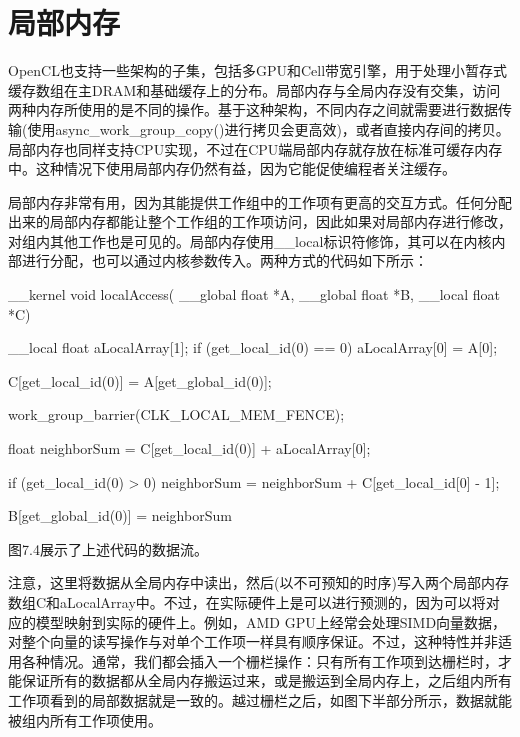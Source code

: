 \section{局部内存}

OpenCL也支持一些架构的子集，包括多GPU和Cell带宽引擎，用于处理小暂存式缓存数组在主DRAM和基础缓存上的分布。局部内存与全局内存没有交集，访问两种内存所使用的是不同的操作。基于这种架构，不同内存之间就需要进行数据传输(使用async\_\allowbreak{}work\_\allowbreak{}group\_\allowbreak{}copy()进行拷贝会更高效)，或者直接内存间的拷贝。局部内存也同样支持CPU实现，不过在CPU端局部内存就存放在标准可缓存内存中。这种情况下使用局部内存仍然有益，因为它能促使编程者关注缓存。

局部内存非常有用，因为其能提供工作组中的工作项有更高的交互方式。任何分配出来的局部内存都能让整个工作组的工作项访问，因此如果对局部内存进行修改，对组内其他工作也是可见的。局部内存使用\_\allowbreak{}\_\allowbreak{}local标识符修饰，其可以在内核内部进行分配，也可以通过内核参数传入。两种方式的代码如下所示：

\begin{codebox}[cpp]
__kernel
void localAccess(
  __global float *A,
  __global float *B,
  __local float *C){

  __local float aLocalArray[1];
  if (get_local_id(0) == 0){
    aLocalArray[0] = A[0];
  }

  C[get_local_id(0)] = A[get_global_id(0)];

  work_group_barrier(CLK_LOCAL_MEM_FENCE);

  float neighborSum = C[get_local_id(0)] + aLocalArray[0];

  if (get_local_id(0) > 0){
    neighborSum = neighborSum + C[get_local_id[0] - 1];
  }

  B[get_global_id(0)] = neighborSum
}
\end{codebox}

图7.4展示了上述代码的数据流。


注意，这里将数据从全局内存中读出，然后(以不可预知的时序)写入两个局部内存数组C和aLocalArray中。不过，在实际硬件上是可以进行预测的，因为可以将对应的模型映射到实际的硬件上。例如，AMD GPU上经常会处理SIMD向量数据，对整个向量的读写操作与对单个工作项一样具有顺序保证。不过，这种特性并非适用各种情况。通常，我们都会插入一个栅栏操作：只有所有工作项到达栅栏时，才能保证所有的数据都从全局内存搬运过来，或是搬运到全局内存上，之后组内所有工作项看到的局部数据就是一致的。越过栅栏之后，如图下半部分所示，数据就能被组内所有工作项使用。

